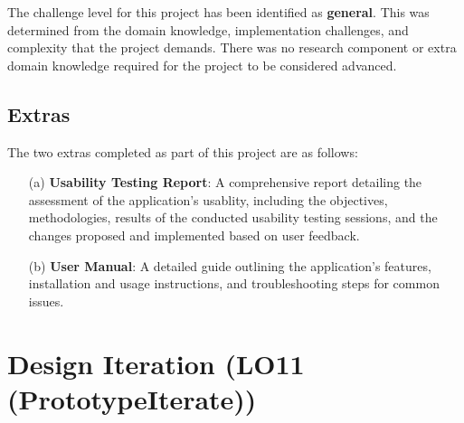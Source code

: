 \documentclass{article}
\begin{document}
The challenge level for this project has been identified as \textbf{general}.
This was determined from the domain knowledge, implementation challenges, and
complexity that the project demands. There was no research component or extra
domain knowledge required for the project to be considered advanced.

\subsection{Extras}

The two extras completed as part of this project are as follows:
\begin{itemize}
    \item[(a)] \textbf{Usability Testing Report}: A comprehensive report
    detailing the assessment of the application's usablity, including the
    objectives, methodologies, results of the conducted usability testing
    sessions, and the changes proposed and implemented based on user feedback.
    \item[(b)] \textbf{User Manual}: A detailed guide outlining the
    application's features, installation and usage instructions, and
    troubleshooting steps for common issues.
\end{itemize}


\section{Design Iteration (LO11 (PrototypeIterate))}


\end{document}

